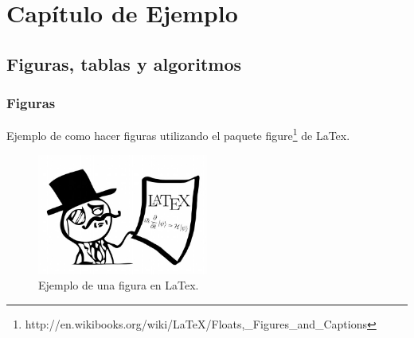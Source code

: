 \chapter{Capítulo de Ejemplo}

\section{Figuras, tablas y algoritmos}

\label{sec:figuras-tablas-algoritmos}
\subsection{Figuras}
Ejemplo de como hacer figuras utilizando el paquete figure\footnote{http://en.wikibooks.org/wiki/LaTeX/Floats,\_Figures\_and\_Captions} de LaTex.
\begin{figure}[!htbp]
    \centering
    \includegraphics[width=0.5\textwidth]{capitulo-ej/graphics/latex.jpg}
    \caption{\label{fig:figura-ejemplo}Ejemplo de una figura en LaTex.}

\end{figure}

